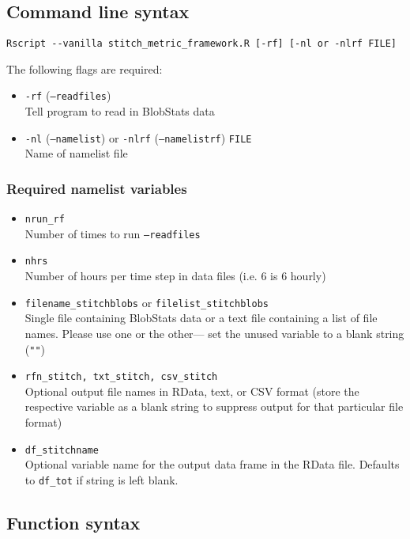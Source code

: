 \documentclass{article}
\begin{document}
\subsection{Command line syntax}
\begin{verbatim}
Rscript --vanilla stitch_metric_framework.R [-rf] [-nl or -nlrf FILE]
\end{verbatim}

The following flags are required:
\begin{itemize}
\item[] \texttt{-rf} (\texttt{--readfiles}) \\ Tell program to read in BlobStats data
\item[]\texttt{-nl} (\texttt{--namelist}) or \texttt{-nlrf} (\texttt{--namelistrf}) \texttt{FILE}\\ Name of namelist file
\end{itemize}

\subsubsection{Required namelist variables}
\begin{itemize}
\item[] \texttt{nrun\_rf}\\ Number of times to run \texttt{--readfiles}
\item[] \texttt{nhrs}\\Number of hours per time step in data files (i.e. 6 is 6 hourly)
\item[] \texttt{filename\_stitchblobs} or \texttt{filelist\_stitchblobs}\\ Single file containing BlobStats data or a text file containing a list of file names. Please use one or the other--- set the unused variable to a blank string (\texttt{""})
\item[] \texttt{rfn\_stitch, txt\_stitch, csv\_stitch}\\ Optional output file names in RData, text, or CSV format (store the respective variable as a blank string to suppress output for that particular file format)
\item[] \texttt{df\_stitchname}\\Optional variable name for the output data frame in the RData file. Defaults to \texttt{df\_tot} if string is left blank.
\end{itemize}

\subsection{Function syntax}
\end{document}
